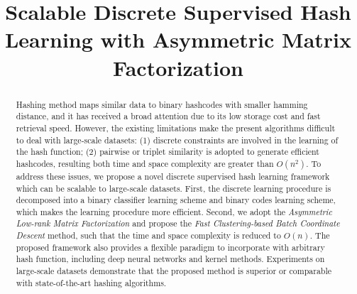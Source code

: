 \documentclass[conference]{IEEEtran}
\begin{document}
\title{Scalable Discrete Supervised Hash Learning with Asymmetric Matrix Factorization}


\author{
}










\maketitle

\begin{abstract}
Hashing method maps similar data to binary hashcodes with smaller hamming distance, and it has received a broad attention due to its low storage cost and fast retrieval speed. However, the existing limitations make the present algorithms difficult to deal with large-scale datasets: (1) discrete constraints are involved in the learning of the hash function; (2) pairwise or triplet similarity is adopted to generate efficient hashcodes, resulting both time and space complexity are greater than $O(n^2)$. To address these issues, we propose a novel discrete supervised hash learning framework which can be scalable to large-scale datasets. First, the discrete learning procedure is decomposed into a binary classifier learning scheme and binary codes learning scheme, which makes the learning procedure more efficient. Second, we adopt the {\em Asymmetric Low-rank Matrix Factorization} and propose the {\em Fast Clustering-based Batch Coordinate Descent} method, such that the time and space complexity is reduced to $O(n)$. The proposed framework also provides a flexible paradigm to incorporate with arbitrary hash function, including deep neural networks and kernel methods. Experiments on large-scale datasets demonstrate that the proposed method is superior or comparable with state-of-the-art hashing algorithms.
\end{abstract}







\IEEEpeerreviewmaketitle
\end{document}
